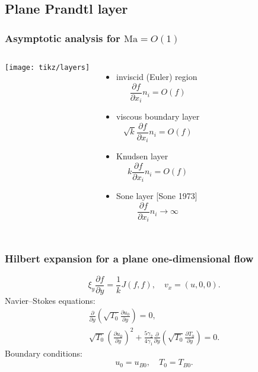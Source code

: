 \documentclass[mathserif]{beamer} %
\newcommand{\Ma}{\mathrm{Ma}}
\newcommand{\pder}[2][]{\frac{\partial#1}{\partial#2}}
\newcommand{\OO}[1]{O(#1)}
\begin{document}
\subsection{Plane Prandtl layer}

\begin{frame}
    \frametitle{Asymptotic analysis for \(\Ma = \OO{1}\)}
   	\begin{columns}
		\begin{center}
		    \vspace{-27pt}
			\texttt{[image: tikz/layers]}
		\end{center}
		\vspace{-10pt}
		\begin{itemize}
			\item inviscid (Euler) region \[ \pder[f]{x_i}n_i = \OO{f} \]
			\item viscous boundary layer \[ \sqrt{k}\pder[f]{x_i}n_i = \OO{f} \]
			\item Knudsen layer \[ k\pder[f]{x_i}n_i = \OO{f} \]
			\item Sone layer [Sone 1973] \[ \pder[f]{x_i}n_i \to \infty \]
		\end{itemize}
	\end{columns}
\end{frame}

\begin{frame}
    \frametitle{Hilbert expansion for a plane one-dimensional flow}
    \begin{equation}\label{eq:Hilbert_plane_1d}
        \xi_y\pder[f]{y} = \frac1k J(f,f), \quad v_x = (u, 0, 0).
    \end{equation}
    \pause
    Navier--Stokes equations:
    \begin{gather}
        \pder{y}\left( \sqrt{T_0}\pder[u_0]{y} \right) = 0, \\
        \sqrt{T_0}\left( \pder[u_0]{y}\right)^2 + \frac{5\gamma_2}{4\gamma_1}\pder{y}\left(\sqrt{T_0}\pder[T_0]{y} \right) = 0.
    \end{gather}
    Boundary conditions:
    \begin{equation}
        u_0 = u_{B0}, \quad T_0 = T_{B0}.
    \end{equation}
\end{frame}
\end{document}

